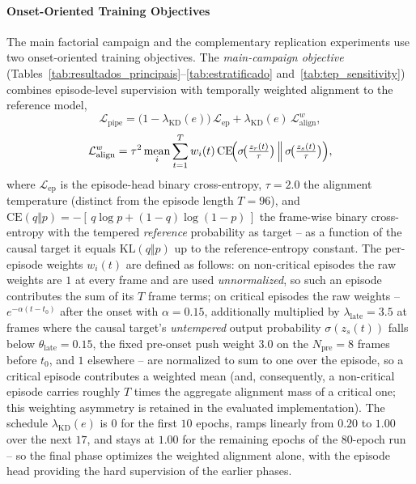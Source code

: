 \documentclass[a4paper,fleqn]{cas-dc}
\begin{document}
\paragraph{Onset-Oriented Training Objectives}
{\color{\revcolor}The main factorial campaign and the complementary
replication experiments use two onset-oriented training objectives. The
\emph{main-campaign objective}
(Tables~\ref{tab:resultados_principais}--\ref{tab:estratificado}
and~\ref{tab:tep_sensitivity}) combines episode-level supervision with
temporally weighted alignment to the reference model,
\begin{equation}
  \mathcal{L}_{\text{pipe}} =
    \bigl(1-\lambda_{\mathrm{KD}}(e)\bigr)\,\mathcal{L}_{\text{ep}}
    + \lambda_{\mathrm{KD}}(e)\,\mathcal{L}^{w}_{\text{align}},
  \label{eq:perda_pipeline}
\end{equation}
\begin{equation}
  \mathcal{L}^{w}_{\text{align}} = \tau^{2}\operatorname*{mean}_{i}
    \sum_{t=1}^{T} w_i(t)\,
    \mathrm{CE}\!\Bigl(\sigma\!\bigl(\tfrac{z_r(t)}{\tau}\bigr)
      \,\Big\Vert\, \sigma\!\bigl(\tfrac{z_s(t)}{\tau}\bigr)\Bigr),
  \label{eq:align_pipeline}
\end{equation}
where $\mathcal{L}_{\text{ep}}$ is the episode-head binary cross-entropy,
$\tau{=}2.0$ the alignment temperature (distinct from the episode length
$T{=}96$), and $\mathrm{CE}(q \Vert p) = -[\,q\log p + (1-q)\log(1-p)\,]$ the
frame-wise binary cross-entropy with the tempered \emph{reference} probability
as target -- as a function of the causal target it equals
$\mathrm{KL}(q \Vert p)$ up to the reference-entropy constant. The per-episode
weights $w_i(t)$ are defined as follows: on non-critical episodes the raw
weights are $1$ at every frame
and are used \emph{unnormalized}, so such an episode contributes the sum of
its $T$ frame terms; on critical episodes the raw weights -- $e^{-\alpha(t-t_0)}$
after the onset with $\alpha{=}0.15$, additionally multiplied by
$\lambda_{\text{late}}{=}3.5$ at frames where the causal target's
\emph{untempered} output probability $\sigma(z_s(t))$ falls below
$\theta_{\text{late}}{=}0.15$, the fixed pre-onset push weight $3.0$ on the
$N_{\text{pre}}{=}8$ frames before $t_0$, and $1$ elsewhere -- are normalized
to sum to one over the episode, so a critical episode contributes a weighted
mean (and, consequently, a non-critical episode carries roughly $T$ times the
aggregate alignment mass of a critical one; this weighting asymmetry is
retained in the evaluated implementation). The schedule
$\lambda_{\mathrm{KD}}(e)$ is $0$ for the first $10$ epochs, ramps linearly
from $0.20$ to $1.00$ over the next $17$, and stays at $1.00$ for the
remaining epochs of the $80$-epoch run -- so the final phase optimizes the
weighted alignment alone, with the episode head providing the hard
supervision of the earlier phases.

}
\end{document}
